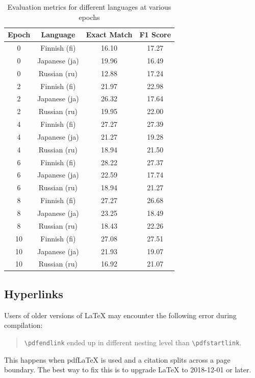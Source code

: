 \documentclass[11pt]{article}
\begin{document}
\begin{table}[ht]
    \centering
    \begin{tabular}{|c|c|c|c|}
        \hline
        Epoch & Language & Exact Match & F1 Score \\
        \hline
        0 & Finnish (fi) & 16.10 & 17.27 \\
        0 & Japanese (ja) & 19.96 & 16.49 \\
        0 & Russian (ru) & 12.88 & 17.24 \\
        \hline
        2 & Finnish (fi) & 21.97 & 22.98 \\
        2 & Japanese (ja) & 26.32 & 17.64 \\
        2 & Russian (ru) & 19.95 & 22.00 \\
        \hline
        4 & Finnish (fi) & 27.27 & 27.39 \\
        4 & Japanese (ja) & 21.27 & 19.28 \\
        4 & Russian (ru) & 18.94 & 21.50 \\
        \hline
        6 & Finnish (fi) & 28.22 & 27.37 \\
        6 & Japanese (ja) & 22.59 & 17.74 \\
        6 & Russian (ru) & 18.94 & 21.27 \\
        \hline
        8 & Finnish (fi) & 27.27 & 26.68 \\
        8 & Japanese (ja) & 23.25 & 18.49 \\
        8 & Russian (ru) & 18.43 & 22.26 \\
        \hline
        10 & Finnish (fi) & 27.08 & 27.51 \\
        10 & Japanese (ja) & 21.93 & 19.07 \\
        10 & Russian (ru) & 16.92 & 21.07 \\
        \hline
    \end{tabular}
    \caption{Evaluation metrics for different languages at various epochs}
    \label{tab:evaluation_metrics}
\end{table}




\subsection{Hyperlinks}

Users of older versions of \LaTeX{} may encounter the following error during compilation:
\begin{quote}
\verb|\pdfendlink| ended up in different nesting level than \verb|\pdfstartlink|.
\end{quote}
This happens when pdf\LaTeX{} is used and a citation splits across a page boundary. The best way to fix this is to upgrade \LaTeX{} to 2018-12-01 or later.
\end{document}
